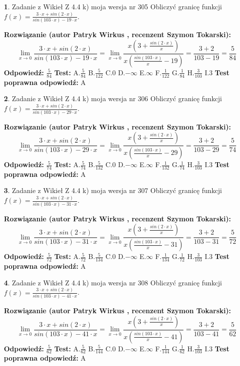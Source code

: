 \documentclass[12pt, a4paper]{article}
\theoremstyle{definition} %
\newtheorem{zad}{}
\newcommand{\zadStart}[1]{\begin{zad}#1\newline}
\newcommand{\zadStop}{\end{zad}}
\newcommand{\rozwStart}[2]{\noindent \textbf{Rozwiązanie (autor #1 , recenzent #2): }\newline}
\newcommand{\rozwStop}{\newline}
\newcommand{\odpStart}{\noindent \textbf{Odpowiedź:}\newline}
\newcommand{\odpStop}{\newline}
\newcommand{\testStart}{\noindent \textbf{Test:}\newline}
\newcommand{\testStop}{\newline}
\newcommand{\kluczStart}{\noindent \textbf{Test poprawna odpowiedź:}\newline}
\newcommand{\kluczStop}{\newline}
\begin{document}
\zadStart{Zadanie z Wikieł Z 4.4 k) moja wersja nr 305}
Obliczyć granicę funkcji $f(x)=\frac{3\cdot x +sin(2\cdot x)}{sin(103\cdot x) -19\cdot x}$.
\zadStop
\rozwStart{Patryk Wirkus}{Szymon Tokarski}
$$\lim\limits_{x\to 0}\frac{3\cdot x +sin(2\cdot x)}{sin(103\cdot x) -19\cdot x}
=\lim\limits_{x\to 0}\frac{x(3+\frac{sin(2\cdot x)}{x})}{x(\frac{sin(103\cdot x)}{x}-19)}
=\frac{3+2}{103-19} = \frac{5}{84}$$
\rozwStop
\odpStart
$\frac{5}{84}$
\odpStop
\testStart
A.$\frac{5}{84}$
B.$\frac{5}{122}$
C.$0$
D.$-\infty$
E.$\infty$
F.$\frac{1}{122}$
G.$\frac{1}{84}$
H.$\frac{3}{103}$
I.$3$
\testStop
\kluczStart
A
\kluczStop



\zadStart{Zadanie z Wikieł Z 4.4 k) moja wersja nr 306}
Obliczyć granicę funkcji $f(x)=\frac{3\cdot x +sin(2\cdot x)}{sin(103\cdot x) -29\cdot x}$.
\zadStop
\rozwStart{Patryk Wirkus}{Szymon Tokarski}
$$\lim\limits_{x\to 0}\frac{3\cdot x +sin(2\cdot x)}{sin(103\cdot x) -29\cdot x}
=\lim\limits_{x\to 0}\frac{x(3+\frac{sin(2\cdot x)}{x})}{x(\frac{sin(103\cdot x)}{x}-29)}
=\frac{3+2}{103-29} = \frac{5}{74}$$
\rozwStop
\odpStart
$\frac{5}{74}$
\odpStop
\testStart
A.$\frac{5}{74}$
B.$\frac{5}{132}$
C.$0$
D.$-\infty$
E.$\infty$
F.$\frac{1}{132}$
G.$\frac{1}{74}$
H.$\frac{3}{103}$
I.$3$
\testStop
\kluczStart
A
\kluczStop



\zadStart{Zadanie z Wikieł Z 4.4 k) moja wersja nr 307}
Obliczyć granicę funkcji $f(x)=\frac{3\cdot x +sin(2\cdot x)}{sin(103\cdot x) -31\cdot x}$.
\zadStop
\rozwStart{Patryk Wirkus}{Szymon Tokarski}
$$\lim\limits_{x\to 0}\frac{3\cdot x +sin(2\cdot x)}{sin(103\cdot x) -31\cdot x}
=\lim\limits_{x\to 0}\frac{x(3+\frac{sin(2\cdot x)}{x})}{x(\frac{sin(103\cdot x)}{x}-31)}
=\frac{3+2}{103-31} = \frac{5}{72}$$
\rozwStop
\odpStart
$\frac{5}{72}$
\odpStop
\testStart
A.$\frac{5}{72}$
B.$\frac{5}{134}$
C.$0$
D.$-\infty$
E.$\infty$
F.$\frac{1}{134}$
G.$\frac{1}{72}$
H.$\frac{3}{103}$
I.$3$
\testStop
\kluczStart
A
\kluczStop



\zadStart{Zadanie z Wikieł Z 4.4 k) moja wersja nr 308}
Obliczyć granicę funkcji $f(x)=\frac{3\cdot x +sin(2\cdot x)}{sin(103\cdot x) -41\cdot x}$.
\zadStop
\rozwStart{Patryk Wirkus}{Szymon Tokarski}
$$\lim\limits_{x\to 0}\frac{3\cdot x +sin(2\cdot x)}{sin(103\cdot x) -41\cdot x}
=\lim\limits_{x\to 0}\frac{x(3+\frac{sin(2\cdot x)}{x})}{x(\frac{sin(103\cdot x)}{x}-41)}
=\frac{3+2}{103-41} = \frac{5}{62}$$
\rozwStop
\odpStart
$\frac{5}{62}$
\odpStop
\testStart
A.$\frac{5}{62}$
B.$\frac{5}{144}$
C.$0$
D.$-\infty$
E.$\infty$
F.$\frac{1}{144}$
G.$\frac{1}{62}$
H.$\frac{3}{103}$
I.$3$
\testStop
\kluczStart
A
\kluczStop
\end{document}
